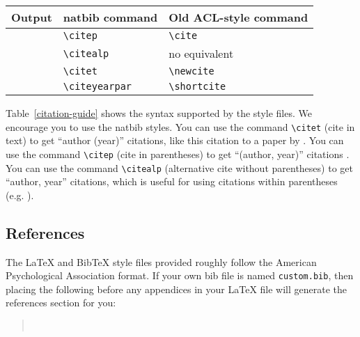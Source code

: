 \documentclass[11pt]{article}
\begin{document}
\begin{table*}
  \centering
  \begin{tabular}{lll}
    \hline
    \textbf{Output}           & \textbf{natbib command} & \textbf{Old ACL-style command} \\
    \hline
    \citep{Gusfield:97}       & \verb|\citep|           & \verb|\cite|                   \\
    \citealp{Gusfield:97}     & \verb|\citealp|         & no equivalent                  \\
    \citet{Gusfield:97}       & \verb|\citet|           & \verb|\newcite|                \\
    \citeyearpar{Gusfield:97} & \verb|\citeyearpar|     & \verb|\shortcite|              \\
    \hline
  \end{tabular}
  \caption{\label{citation-guide}
    Citation commands supported by the style file.
    The style is based on the natbib package and supports all natbib citation commands.
    It also supports commands defined in previous ACL style files for compatibility.
  }
\end{table*}

Table~\ref{citation-guide} shows the syntax supported by the style files.
We encourage you to use the natbib styles.
You can use the command \verb|\citet| (cite in text) to get ``author (year)'' citations, like this citation to a paper by \citet{Gusfield:97}.
You can use the command \verb|\citep| (cite in parentheses) to get ``(author, year)'' citations \citep{Gusfield:97}.
You can use the command \verb|\citealp| (alternative cite without parentheses) to get ``author, year'' citations, which is useful for using citations within parentheses (e.g. \citealp{Gusfield:97}).

\subsection{References}

\nocite{Ando2005,borschinger-johnson-2011-particle,andrew2007scalable,rasooli-tetrault-2015,goodman-etal-2016-noise,harper-2014-learning}

The \LaTeX{} and Bib\TeX{} style files provided roughly follow the American Psychological Association format.
If your own bib file is named \texttt{custom.bib}, then placing the following before any appendices in your \LaTeX{} file will generate the references section for you:
\begin{quote}
  \begin{verbatim}


\end{verbatim}
\end{quote}
\end{document}
